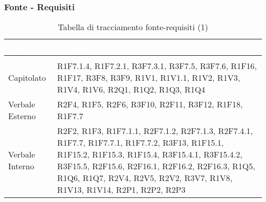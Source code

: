 \subsubsection{Fonte - Requisiti}
\renewcommand{\arraystretch}{1.5}
{
\setlength\arrayrulewidth{0.8pt}
\begin{longtable}{C{3cm} | C{12cm}}
		\textcolor{white}{\textbf{Fonte}} & 
		\textcolor{white}{\textbf{Requisiti}}\\
		\endfirsthead
	    \\
	    \endfoot
	    \caption{Tabella di tracciamento fonte-requisiti (1)}
	    \endlastfoot


Capitolato &  	R1F7.1.4, R1F7.2.1, R3F7.3.1, R3F7.5, R3F7.6, R1F16, R1F17, R3F8, R3F9, R1V1, R1V1.1, R1V2, R1V3, R1V4, R1V6, R2Q1, R1Q2, R1Q3, R1Q4 \\

Verbale Esterno & R2F4, R1F5, R2F6, R3F10, R2F11, R3F12, R1F18, R1F7.7 \\

Verbale Interno & 	R2F2, R1F3, R1F7.1.1, R2F7.1.2, R2F7.1.3, R2F7.4.1, R1F7.7, R1F7.7.1, R1F7.7.2, R3F13, R1F15.1, R1F15.2, R1F15.3, R1F15.4, R3F15.4.1, R3F15.4.2, R3F15.5, R2F15.6, R2F16.1, R2F16.2, R2F16.3, R1Q5, R1Q6, R1Q7, R2V4, R2V5, R2V2, R3V7, R1V8, R1V13, R1V14, R2P1, R2P2, R2P3 \\

\end{longtable}
}

